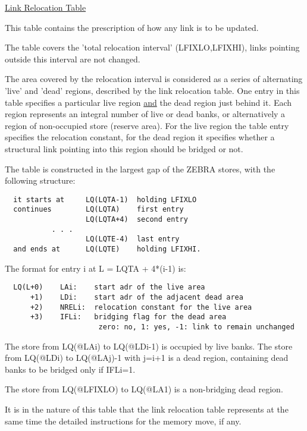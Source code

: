 \begin{flushright} \ul{\large Link Relocation Table}
\end{flushright}

This table contains the prescription of how any link is to be
updated.

The table covers the 'total relocation interval'
(LFIXLO,LFIXHI),
links pointing outside this interval are not changed.

The area covered by the relocation interval is considered as a
series of alternating 'live' and 'dead' regions,
described by the link relocation table.
One entry in this table specifies a particular live region
\ul{and}
the dead region just behind it.
Each region represents an integral number of live or dead banks,
or alternatively a region of non-occupied store (reserve area).
For the live region the table entry specifies the relocation
constant, for the dead region it specifies whether a structural link
pointing into this region should be bridged or not.

The table is constructed in the largest gap of the ZEBRA stores,
with the following structure:

\begin{verbatim}
  it starts at     LQ(LQTA-1)  holding LFIXLO
  continues        LQ(LQTA)    first entry
                   LQ(LQTA+4)  second entry
           . . .
                   LQ(LQTE-4)  last entry
  and ends at      LQ(LQTE)    holding LFIXHI.

\end{verbatim} 
The format for entry i at  L = LQTA + 4*(i-1) is:

\begin{verbatim}
  LQ(L+0)    LAi:    start adr of the live area
      +1)    LDi:    start adr of the adjacent dead area
      +2)    NRELi:  relocation constant for the live area
      +3)    IFLi:   bridging flag for the dead area
                      zero: no, 1: yes, -1: link to remain unchanged
\end{verbatim} 

The store from LQ(@LAi) to LQ(@LDi-1) is occupied
by live banks.
The store from LQ(@LDi) to LQ(@LAj)-1 with j=i+1
is a dead region,
containing dead banks to be bridged only if  IFLi=1.

The store from LQ(@LFIXLO) to LQ(@LA1)
is a non-bridging dead region.

It is in the nature of this table that the link relocation table
represents at the same time the detailed instructions for
the memory move, if any.

